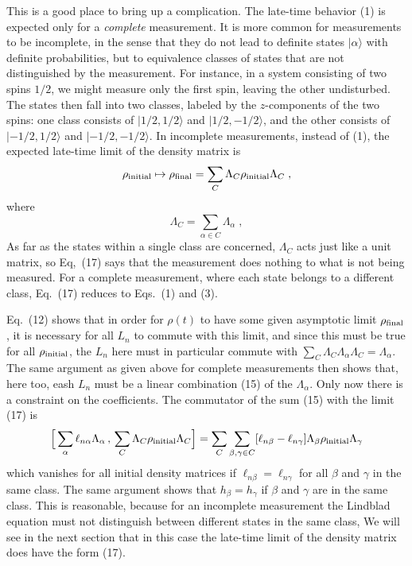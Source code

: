 \documentclass[12pt]{article}
\begin{document}
This is a good place to bring up a complication.  The late-time behavior (1) is expected only for a {\em complete} measurement.  It is more common for measurements to be incomplete, in the sense that they do not lead to definite states $|\alpha\rangle$ with definite probabilities, but to equivalence classes of  states that are not distinguished by the measurement.  For instance, in a system consisting of two spins $1/2$, we might measure only the first spin, leaving the other undisturbed.  The states then fall into two classes, labeled by the $z$-components of the two spins: one class consists of $|1/2,1/2\rangle$ and  $|1/2,-1/2\rangle$, and the other consists of $|-1/2,1/2\rangle$ and  $|-1/2,-1/2\rangle$.  In incomplete measurements, instead of (1), the expected late-time limit of the density matrix is
\begin{equation}
\rho_{\rm initial}\mapsto\rho_{\rm final}=\sum_C \Lambda_C\rho_{\rm initial}\Lambda_C \;,
\end{equation}
where 
\begin{equation}
\Lambda_C=\sum_{\alpha\in C}\Lambda_\alpha\;,
\end{equation}
As far as the states within a single class are concerned, $\Lambda_C$ acts just like a unit matrix, so Eq,~(17) says that the measurement does nothing to what is not being measured.   For a complete measurement, where each  state belongs to a different class, Eq.~(17) reduces to Eqs.~(1) and (3).

 Eq.~(12) shows that in order for $\rho(t)$ to have some given asymptotic limit $\rho_{\rm final}$, it is necessary  for all $L_n$ to commute with 
this limit, and since this must be true for all $\rho_{\rm initial}$, the $L_n$ here must in particular commute with $\sum_C\Lambda_C\Lambda_\alpha\Lambda_C=\Lambda_\alpha$.  The same argument as given above for complete measurements then shows that, here too, eash $L_n$ must be a linear combination (15) of the $\Lambda_\alpha$.  Only now there is a constraint on the coefficients.  The commutator of the sum (15) with the limit (17) is 
$$ \Big[\sum_\alpha \ell_{n\alpha} \Lambda_\alpha\,,\,\sum_C \Lambda_C\rho_{\rm initial}\Lambda_C\Big]
=\sum_C\sum_{\beta,\gamma\in C}[\ell_{n\beta}-\ell_{n\gamma}]\Lambda_\beta\rho_{\rm initial}\Lambda_\gamma$$
which vanishes for all initial density matrices if $\ell_{n\beta}=\ell_{n\gamma}$ for all $\beta$ and $\gamma$ in the same class.  The same argument shows that $h_\beta=h_\gamma$ if $\beta$ and $\gamma$ are in the same class.
This is reasonable, because for an incomplete measurement the Lindblad equation must not distinguish between different states in the same class,  We will see in the next section that in this case 
the late-time limit of the density matrix does have the form (17).
\end{document}
